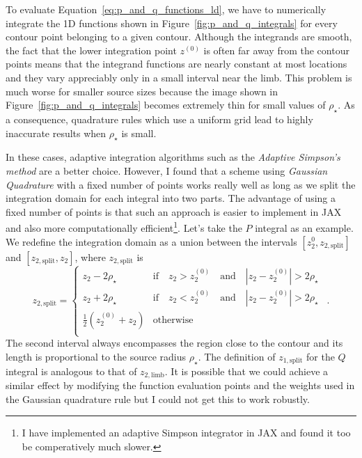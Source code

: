 \documentclass[12pt,dvipsnames]{report}
\newcommand{\ssf}[1]{\textsf{#1}}
\newcommand{\hquad}{~~}
\begin{document}
To evaluate Equation~\ref{eq:p_and_q_functions_ld}, we have to numerically integrate
the 1D functions shown in Figure~\ref{fig:p_and_q_integrals} for every contour point 
belonging to a given contour.
Although the integrands are smooth, the fact that the  lower integration point $z^{(0)}$ is 
often far away from the contour points means that the integrand
functions are nearly constant at most locations and they vary appreciably only in a small
interval near the limb. This problem is much worse for smaller source sizes because the 
image shown in Figure~\ref{fig:p_and_q_integrals} becomes extremely thin for small values 
of $\rho_\star$. As a consequence, quadrature rules which use a uniform grid 
lead to highly inaccurate results when $\rho_\star$ is small.

In these cases, adaptive integration algorithms such as the \emph{Adaptive Simpson's method}
are a better choice. However, I found that a scheme using \emph{Gaussian Quadrature} with a 
fixed number of points works really well as long as we split the integration domain for each 
integral into two parts. 
The advantage of using a fixed number of points is that such an approach is easier to implement 
in \ssf{JAX} and also more computationally efficient\footnote{I have implemented an
adaptive Simpson integrator in \ssf{JAX} and found it too be comperatively much slower.}. 
Let's take the $P$ integral as an example. We redefine the integration domain 
as a union between the intervals $[z_2^{0}, z_{2,\mathrm{split}}]$
and $[z_{2,\mathrm{split}}, z_2]$, where $z_{2, \mathrm{split}}$ is 
\begin{equation}
        z_{2,\mathrm{split}}=
    \begin{cases}
       z_2 - 2\rho_\star & \text{if}\quad z_2> z_2^{(0)} \quad\text{and}\quad |z_2 - z_2^{(0)}|>2\rho_\star\\
       z_2 + 2\rho_\star & \text{if}\quad z_2 < z_2^{(0)} \quad\text{and}\quad |z_2 - z_2^{(0)}|>2\rho_\star\\
       \frac{1}{2}(z_2^{(0)} + z_2) &\text{otherwise}\\
    \end{cases}
    \hquad .
    \label{eq:z_split}
\end{equation}
The second interval always encompasses the region close to the contour and its length 
is proportional to the source radius $\rho_\star$.  The definition of $z_{1,\mathrm{split}}$
for the $Q$ integral is analogous to that of $z_{2, \mathrm{limb}}$.
It is possible that we could achieve a similar effect by modifying the function evaluation 
points and the weights used in the Gaussian quadrature rule but I could not get this to work 
robustly.
\end{document}
